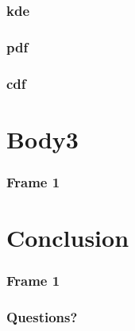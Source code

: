 \documentclass{beamer}
\begin{document}
\begin{frame}
\frametitle{kde}
\end{frame}

\begin{frame}
\frametitle{pdf}
\end{frame}

\begin{frame}
\frametitle{cdf}
\end{frame}

\section{Body3}
\begin{frame}
\frametitle{Frame 1}
\end{frame}
\section{Conclusion}
\begin{frame}
\frametitle{Frame 1}
\end{frame}

\begin{frame}
\frametitle{Questions?}
\end{frame}
\end{document}
